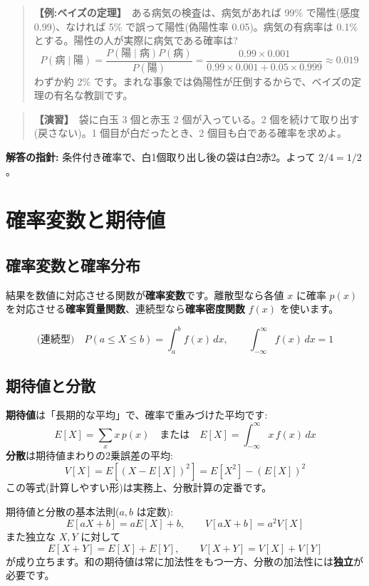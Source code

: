 \documentclass{article}
\begin{document}
\begin{quote}
\textbf{【例:ベイズの定理】}\ ある病気の検査は、病気があれば 99\% で陽性(感度 0.99)、なければ 5\% で誤って陽性(偽陽性率 0.05)。病気の有病率は 0.1\% とする。陽性の人が実際に病気である確率は?
\[ P(\text{病} \mid \text{陽}) = \frac{P(\text{陽} \mid \text{病}) P(\text{病})}{P(\text{陽})} = \frac{0.99 \times 0.001}{0.99 \times 0.001 + 0.05 \times 0.999} \approx 0.019 \]
わずか約 2\% です。まれな事象では偽陽性が圧倒するからで、ベイズの定理の有名な教訓です。
\end{quote}

\begin{quote}
\textbf{【演習】}\ 袋に白玉 3 個と赤玉 2 個が入っている。2 個を続けて取り出す(戻さない)。1 個目が白だったとき、2 個目も白である確率を求めよ。
\end{quote}

\textbf{解答の指針:} 条件付き確率で、白1個取り出し後の袋は白2赤2。よって \(2/4 = 1/2\)。

\section{確率変数と期待値}

\subsection{確率変数と確率分布}

結果を数値に対応させる関数が\textbf{確率変数}です。離散型なら各値 \(x\) に確率 \(p(x)\) を対応させる\textbf{確率質量関数}、連続型なら\textbf{確率密度関数} \(f(x)\) を使います。

\[ \text{(連続型)} \quad P(a \le X \le b) = \int_a^b f(x)\, dx, \qquad \int_{-\infty}^{\infty} f(x)\, dx = 1 \]

\subsection{期待値と分散}

\textbf{期待値}は「長期的な平均」で、確率で重みづけた平均です:
\[ E[X] = \sum_x x\, p(x) \quad \text{または} \quad E[X] = \int_{-\infty}^{\infty} x\, f(x)\, dx \]
\textbf{分散}は期待値まわりの2乗誤差の平均:
\[ V[X] = E[(X - E[X])^2] = E[X^2] - (E[X])^2 \]
この等式(計算しやすい形)は実務上、分散計算の定番です。

期待値と分散の基本法則(\(a, b\) は定数):
\[ E[aX + b] = a E[X] + b, \qquad V[aX + b] = a^2 V[X] \]
また独立な \(X, Y\) に対して
\[ E[X+Y] = E[X] + E[Y], \qquad V[X+Y] = V[X] + V[Y] \]
が成り立ちます。和の期待値は常に加法性をもつ一方、分散の加法性には\textbf{独立}が必要です。
\end{document}
